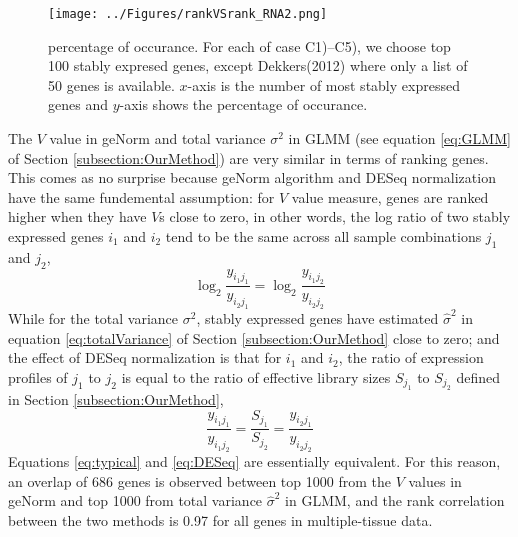 \documentclass[11pt, a4paper]{article}
\begin{document}

 \begin{figure}[h!]
 	\begin{center}
 		\texttt{[image: ../Figures/rankVSrank\_RNA2.png]}
 		\caption{percentage of occurance. For each of case C1)--C5), we choose top 100 stably expresed genes, except Dekkers(2012) where only a list of 50 genes is available. $x$-axis is the number of most stably expressed genes and $y$-axis shows the percentage of occurance.}
	 	\label{fig:rankVSrank_RNA}
	 	\end{center}
 \end{figure}
 
The $V$ value in geNorm \citep{vandesompele2002accurate} and total variance $\sigma^2$ in GLMM (see equation \ref{eq:GLMM} of Section \ref{subsection:OurMethod}) are very similar in terms of ranking genes. This comes as no surprise because geNorm algorithm \citep{vandesompele2002accurate} and DESeq normalization \citep{anders2010differential}
have the same fundemental assumption: for $V$ value measure, genes are ranked higher when they have $V$s close to zero, in other words, the log ratio of two stably expressed genes $i_1$ and $i_2$  tend to be the same across all sample combinations $j_1$ and $j_2$, \begin{equation}\label{eq:typical}
    \log_2\frac{y_{i_1j_1}}{y_{i_2j_1}} = \log_2\frac{y_{i_1j_2}}{y_{i_2j_2}}
\end{equation} 
While for the total variance $\sigma^2$, stably expressed genes have estimated $\hat\sigma^2$ in equation \ref{eq:totalVariance}  of Section \ref{subsection:OurMethod} close to zero; and the effect of DESeq normalization is that for $i_1$ and $i_2$, the ratio of expression profiles of $j_1$ to $j_2$ is equal to the ratio of effective library sizes $S_{j_1}$ to $S_{j_2}$ defined in Section \ref{subsection:OurMethod},
\begin{equation}\label{eq:DESeq} \frac{y_{i_1j_1}}{y_{i_1j_2}} =
    \frac{S_{j_1}}{S_{j_2}}=\frac{y_{i_2j_1}}{y_{i_2j_2}} \end{equation}
 Equations \ref{eq:typical} and \ref{eq:DESeq} are essentially equivalent. For
 this reason, an overlap of 686 genes is observed between top 1000 from the $V$ values in geNorm and top 1000 from total variance $\hat{\sigma}^2$ in GLMM, and the rank correlation between the two methods is 0.97 for all genes in multiple-tissue data. 
\end{document}
